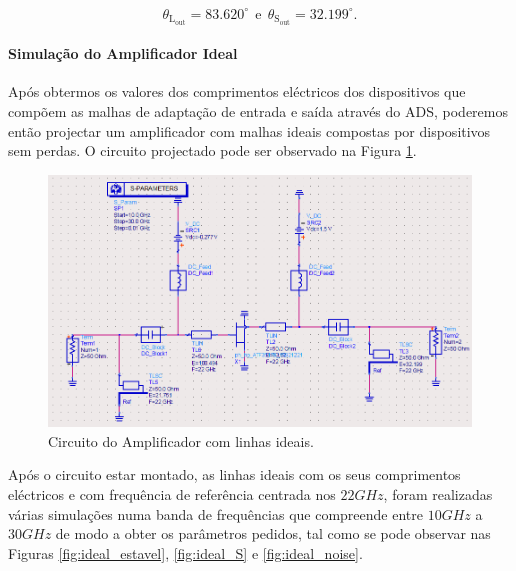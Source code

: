 \documentclass[11pt]{article}
\numberwithin{equation}{section}
\begin{document}
\vspace{-3mm}
\begin{equation}
\theta_{\text{L}_{\text{out}}} = 83.620^{\circ}  ~~ \text{e} ~~ \theta_{\text{S}_{\text{out}}} = 32.199^{\circ}.
\end{equation}

\vspace{1mm} 

\paragraph{Simulação do Amplificador Ideal} \hspace{0pt}  

Após obtermos os valores dos comprimentos eléctricos dos dispositivos que compõem as malhas de adaptação de entrada e saída através do ADS, poderemos então projectar um amplificador com malhas ideais compostas por dispositivos sem perdas. O circuito projectado pode ser observado na Figura \ref{fig:circ_ideal}.

\begin{figure}[H]
	\centering
	\includegraphics[keepaspectratio=true, scale=0.45]{exps/Circuito_ideal}
	\vspace{-0.5em}
	\caption{Circuito do Amplificador com linhas ideais.}
	\vspace{-0.8em}
	\label{fig:circ_ideal}
\end{figure}
 
Após o circuito estar montado, as linhas ideais com os seus comprimentos eléctricos e com frequência de referência centrada nos $ 22 GHz $, foram realizadas várias simulações numa banda de frequências que compreende entre $ 10 GHz $ a $ 30GHz $ de modo a obter os parâmetros pedidos, tal como se pode observar nas Figuras \ref{fig:ideal_estavel}, \ref{fig:ideal_S} e \ref{fig:ideal_noise}.
\end{document}
